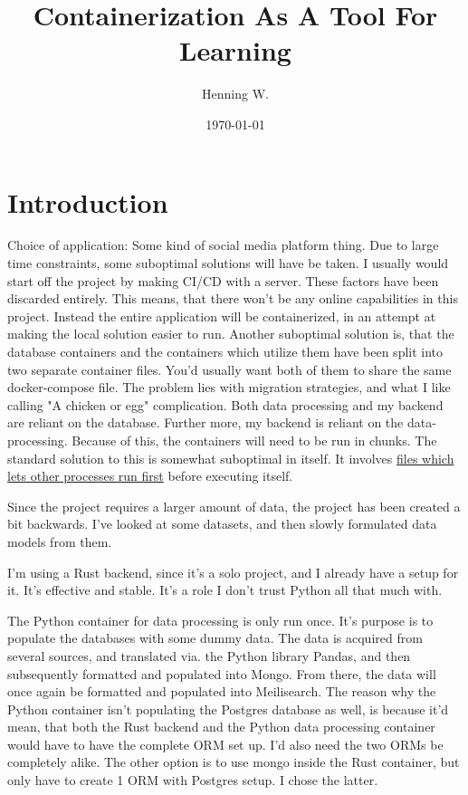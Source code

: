 \documentclass[a4paper, 12pt]{article}
\begin{document}
\title{\Large{\textbf{Containerization As A Tool For Learning}}}
\author{Henning W.}
\date{\today}
\maketitle
\fancyhf{}
\renewcommand{\headrulewidth}{2pt}
\renewcommand{\headrulewidth}{2pt}
\fancyhead{\leftmark}
\fancyfoot{\thepage}

\section{Introduction}
Choice of application: Some kind of social media platform thing. Due to large time constraints, some suboptimal solutions will have be taken. I usually would start off the project by making CI/CD with a server. These factors have been discarded entirely. This means, that there won't be any online capabilities in this project. Instead the entire application will be containerized, in an attempt at making the local solution easier to run. Another suboptimal solution is, that the database containers and the containers which utilize them have been split into two separate container files. You'd usually want both of them to share the same docker-compose file. The problem lies with migration strategies, and what I like calling "A chicken or egg" complication. Both data processing and my backend are reliant on the database. Further more, my backend is reliant on the data-processing. Because of this, the containers will need to be run in chunks. The standard solution to this is somewhat suboptimal in itself. It involves \href{https://github.com/vishnubob/wait-for-it}{files which lets other processes run first} before executing itself.

Since the project requires a larger amount of data, the project has been created a bit backwards. I've looked at some datasets, and then slowly formulated data models from them.

I'm using a Rust backend, since it's a solo project, and I already have a setup for it. It's effective and stable. It's a role I don't trust Python all that much with.

The Python container for data processing is only run once. It's purpose is to populate the databases with some dummy data. The data is acquired from several sources, and translated via. the Python library Pandas, and then subsequently formatted and populated into Mongo. From there, the data will once again be formatted and populated into Meilisearch.
The reason why the Python container isn't populating the Postgres database as well, is because it'd mean, that both the Rust backend and the Python data processing container would have to have the complete ORM set up.
I'd also need the two ORMs be completely alike.
The other option is to use mongo inside the Rust container, but only have to create 1 ORM with Postgres setup. I chose the latter.
\end{document}
